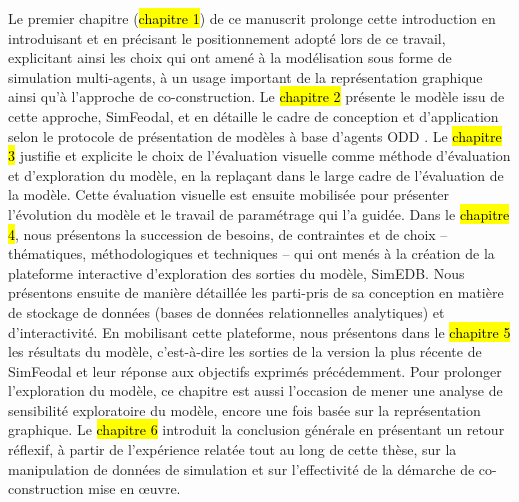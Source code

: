 Le premier chapitre (\hl{chapitre 1}) de ce manuscrit prolonge cette introduction en introduisant et en précisant le positionnement adopté lors de ce travail, explicitant ainsi les choix qui ont amené à la modélisation sous forme de simulation multi-agents, à un usage important de la représentation graphique ainsi qu'à l'approche de co-construction.
Le \hl{chapitre 2} présente le modèle issu de cette approche, \og SimFeodal\fg{}, et en détaille le cadre de conception et d'application selon le protocole de présentation de modèles à base d'agents \og ODD\fg{} \autocite{grimm_odd_2010}.
Le \hl{chapitre 3} justifie et explicite le choix de l'\og{}évaluation visuelle\fg{} comme méthode d'évaluation et d'exploration du modèle, en la replaçant dans le large cadre de l'évaluation de la modèle.
Cette évaluation visuelle est ensuite mobilisée pour présenter l'évolution du modèle et le travail de \og paramétrage\fg{} qui l'a guidée.
Dans le \hl{chapitre 4}, nous présentons la succession de besoins, de contraintes et de choix -- thématiques, méthodologiques et techniques -- qui ont menés à la création de la plateforme interactive d'exploration des sorties du modèle, \og SimEDB\fg{}.
Nous présentons ensuite de manière détaillée les parti-pris de sa conception en matière de stockage de données (bases de données relationnelles analytiques) et d'interactivité.
En mobilisant cette plateforme, nous présentons dans le \hl{chapitre 5} les résultats du modèle, c'est-à-dire les sorties de la version la plus récente de SimFeodal et leur réponse aux objectifs exprimés précédemment.
Pour prolonger l'exploration du modèle, ce chapitre est aussi l'occasion de mener une analyse de sensibilité exploratoire du modèle, encore une fois basée sur la représentation graphique.
Le \hl{chapitre 6} introduit la conclusion générale en présentant un retour réflexif, à partir de l'expérience relatée tout au long de cette thèse, sur la manipulation de données de simulation et sur l'effectivité de la démarche de co-construction mise en œuvre.


\clearpage
\FancyChapter